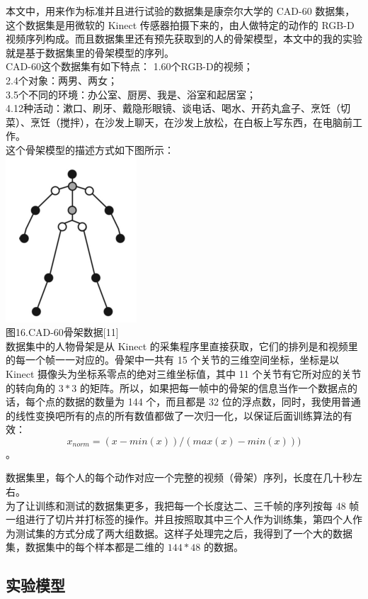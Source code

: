 本文中，用来作为标准并且进行试验的数据集是康奈尔大学的 CAD-60
数据集，这个数据集是用微软的 Kinect 传感器拍摄下来的，由人做特定的动作的
RGB-D
视频序列构成。而且数据集里还有预先获取到的人的骨架模型，本文中的我的实验就是基于数据集里的骨架模型的序列。\\CAD-60这个数据集有如下特点：
1.60个RGB-D的视频；\\2.4个对象：两男、两女；\\3.5个不同的环境：办公室、厨房、我是、浴室和起居室；\\4.12种活动：漱口、刷牙、戴隐形眼镜、谈电话、喝水、开药丸盒子、烹饪（切菜）、烹饪（搅拌），在沙发上聊天，在沙发上放松，在白板上写东西，在电脑前工作。\\这个骨架模型的描述方式如下图所示：\\\includegraphics{picture/skeleton.png}\\图16.CAD-60骨架数据{[}11{]}\\数据集中的人物骨架是从
Kinect
的采集程序里直接获取，它们的排列是和视频里的每一个帧一一对应的。骨架中一共有
15 个关节的三维空间坐标，坐标是以 Kinect
摄像头为坐标系零点的绝对三维坐标值，其中 11
个关节有它所对应的关节的转向角的 \(3*3\)
的矩阵。所以，如果把每一帧中的骨架的信息当作一个数据点的话，每个点的数据的数量为
144 个，而且都是 32
位的浮点数，同时，我使用普通的线性变换吧所有的点的所有数值都做了一次归一化，以保证后面训练算法的有效：\\\[ x_{norm} = (x-min(x))/(max(x)-min(x)) )\]。

数据集里，每个人的每个动作对应一个完整的视频（骨架）序列，长度在几十秒左右。\\为了让训练和测试的数据集更多，我把每一个长度达二、三千帧的序列按每
48
帧一组进行了切片并打标签的操作。并且按照取其中三个人作为训练集，第四个人作为测试集的方式分成了两大组数据。这样子处理完之后，我得到了一个大的数据集，数据集中的每个样本都是二维的
\(144*48\) 的数据。

\subsection{实验模型}\label{ux5b9eux9a8cux6a21ux578b}

